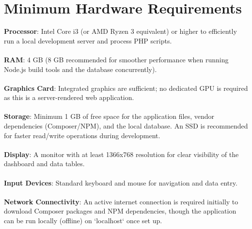 \section{Minimum Hardware Requirements}
\textbf{Processor}: Intel Core i3 (or AMD Ryzen 3 equivalent) or higher to efficiently run a local development server and process PHP scripts.
\\\\
\textbf{RAM}: 4 GB (8 GB recommended for smoother performance when running Node.js build tools and the database concurrently).
\\\\
\textbf{Graphics Card}: Integrated graphics are sufficient; no dedicated GPU is required as this is a server-rendered web application.
\\\\
\textbf{Storage}: Minimum 1 GB of free space for the application files, vendor dependencies (Composer/NPM), and the local database. An SSD is recommended for faster read/write operations during development.
\\\\
\textbf{Display}: A monitor with at least 1366x768 resolution for clear visibility of the dashboard and data tables.
\\\\
\textbf{Input Devices}: Standard keyboard and mouse for navigation and data entry.
\\\\
\textbf{Network Connectivity}: An active internet connection is required initially to download Composer packages and NPM dependencies, though the application can be run locally (offline) on `localhost` once set up.
